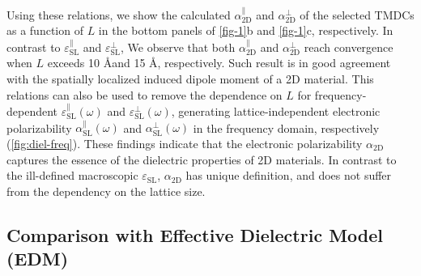 %
%
Using these relations, we show the calculated
$\alpha_{\mathrm{2D}}^{\parallel}$ and $\alpha_{\mathrm{2D}}^{\perp}$
of the selected TMDCs as a function of $L$ in the bottom panels of
 \autoref{fig-1}b and \autoref{fig-1}c, respectively.  In contrast to
$\varepsilon_{\mathrm{SL}}^{\parallel}$ and
$\varepsilon_{\mathrm{SL}}^{\perp}$, We observe that both
$\alpha_{\mathrm{2D}}^{\parallel}$ and $\alpha_{\mathrm{2D}}^{\perp}$
reach convergence when $L$ exceeds 10 \AA and 15 \AA,
respectively. Such result is in good agreement with the spatially
localized induced dipole moment of a 2D material.
%
%
This relations can also be used to remove the dependence on $L$ for
frequency-dependent $\varepsilon^{\parallel}_{\mathrm{SL}}(\omega)$
and $\varepsilon^{\perp}_{\mathrm{SL}}(\omega)$, generating
lattice-independent electronic polarizability
$\alpha^{\parallel}_{\mathrm{SL}}(\omega)$ and
$\alpha^{\perp}_{\mathrm{SL}}(\omega)$ in the frequency domain,
respectively (\autoref{fig:diel-freq}).
%
% 
% 
% 
% 
These findings indicate that the electronic polarizability
$\alpha_{\mathrm{2D}}$ captures the essence of the dielectric
properties of 2D materials. In contrast to the ill-defined macroscopic
$\varepsilon_{\mathrm{SL}}$, $\alpha_{\mathrm{2D}}$ has unique
definition, and does not suffer from the dependency on the lattice
size.

\subsection{Comparison with Effective Dielectric Model (EDM)}
\label{sec:diel-comp-with-effect}

